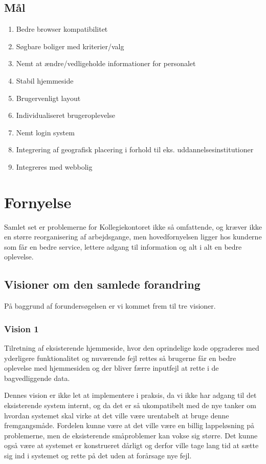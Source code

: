 \documentclass[12pt, a4paper]{report}
\begin{document}
\subsection{Mål}
\begin{enumerate}
\item Bedre browser kompatibilitet
\item Søgbare boliger med kriterier/valg
\item Nemt at ændre/vedligeholde informationer for personalet
\item Stabil hjemmeside
\item Brugervenligt layout
\item Individualiseret brugeroplevelse
\item Nemt login system
\item Integrering af geografisk placering i forhold til eks. uddannelsesinstitutioner
\item Integreres med webbolig
\end{enumerate}


\section{Fornyelse}
Samlet set er problemerne for Kollegiekontoret ikke så omfattende, og kræver ikke en større reorganisering af arbejdsgange, men hovedfornyelsen ligger hos kunderne som får en bedre service, lettere adgang til information og alt i alt en bedre oplevelse.

\subsection{Visioner om den samlede forandring}
På baggrund af forundersøgelsen er vi kommet frem til tre visioner.

\subsubsection{Vision 1}
Tilretning af eksisterende hjemmeside, hvor den oprindelige kode opgraderes med yderligere funktionalitet og nuværende fejl rettes så brugerne får en bedre oplevelse med hjemmesiden og der bliver færre inputfejl at rette i de bagvedliggende data.

Dennes vision er ikke let at implementere i praksis, da vi ikke har adgang til det eksisterende system internt, og da det er så ukompatibelt med de nye tanker om hvordan systemet skal virke at det ville være urentabelt at bruge denne fremgangsmåde. Fordelen kunne være at det ville være en billig lappeløsning på problemerne, men de eksisterende småproblemer kan vokse sig større. Det kunne også være at systemet er konstrueret dårligt og derfor ville tage lang tid at sætte sig ind i systemet og rette på det uden at forårsage nye fejl.
\end{document}
